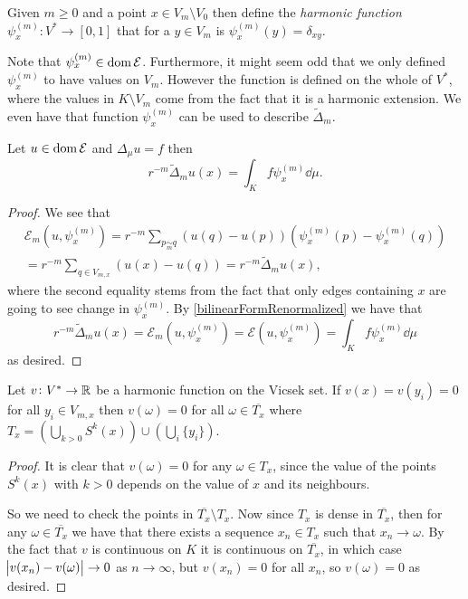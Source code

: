 \begin{defi}
	Given $m \geq 0$ and a point $x \in V_m \setminus V_0$ then define the \emph{harmonic function} \\ $\psi_{x}^{(m)}\colon V^{*} \to [0,1]$ that for a $y \in V_m$ is $\psi_x^{(m)}(y) = \delta_{xy}$.
\end{defi}
Note that $\psi_x^{(m)} \in \operatorname{dom} \mathcal{E}$. Furthermore, it might seem odd that we only defined $\psi_x^{(m)}$ to have values on $V_m$. However the function is defined on the whole of $V^{*}$, where the values in $K \setminus V_m$ come from the fact that it is a harmonic extension. We even have that function $\psi_x^{(m)}$ can be used to describe $\widetilde{\Delta}_{m}$.
\medskip
\begin{prop}\label{pointwiseEqualityofpsi}
	Let $u \in \operatorname{dom} \mathcal{E}$ and $\Delta_{\mu}u = f$ then
	\begin{equation}
		r^{-m}\widetilde{\Delta}_{m}u(x) = \int_{K}f \psi_{x}^{(m)} \dd \mu.
	\end{equation}
\end{prop}
\begin{proof}
	We see that
	\begin{multline}
		\mathcal{E}_{m}(u, \psi_{x}^{(m)}) = r^{-m} \sum_{p \underset{m}{\sim} q} \left(u(q)-u(p)\right)\left(\psi_{x}^{(m)}(p) -\psi_{x}^{(m)}(q)\right) \\
		= r^{-m}\sum_{q \in V_{m,x}} \left(u(x)-u(q)\right) = r^{-m}\widetilde{\Delta}_{m}u(x),
	\end{multline}
	where the second equality stems from the fact that only edges containing $x$ are going to see change in $\psi_{x}^{(m)}$. By \eqref{bilinearFormRenormalized} we have that
	\begin{equation}
		r^{-m}\widetilde{\Delta}_{m}u(x) = \mathcal{E}_{m}(u, \psi_{x}^{(m)}) = \mathcal{E}(u, \psi_{x}^{(m)}) = \int_{K}f \psi_{x}^{(m)} \dd \mu
	\end{equation}
	as desired.
\end{proof}

\begin{lemma}\label{itIsZero}
	Let $v\colon V^{*} \to \mathbb{R}$ be a harmonic function on the Vicsek set. If $v(x) = v(y_i) = 0$ for all $y_i \in V_{m,x}$ then $v(\omega) = 0$ for all $\omega \in \overline{T_x}$ where $T_x = \left( \bigcup_{k > 0} S^{k}(x) \right) \cup \left(\bigcup_{i} \{y_i\} \right)$.
\end{lemma}
\begin{proof}
	It is clear that $v(\omega) = 0$ for any $\omega \in T_x$, since the value of the points $S^{k}(x)$ with $k > 0$ depends on the value of $x$ and its neighbours. 
	
	So we need to check the points in $\overline{T_x} \setminus T_x$. Now since $T_x$ is dense in $\overline{T_x}$, then for any $\omega \in \overline{T_x}$ we have that there exists a sequence $x_n \in T_x$ such that $x_n \to \omega$. By the fact that $v$ is continuous on $K$ it is continuous on $\overline{T_x}$, in which case $\abs{v(x_n) - v(\omega)} \to 0$ as $n \to \infty$, but $v(x_n) = 0$ for all $x_n$, so $v(\omega) = 0$ as desired. 
\end{proof}


